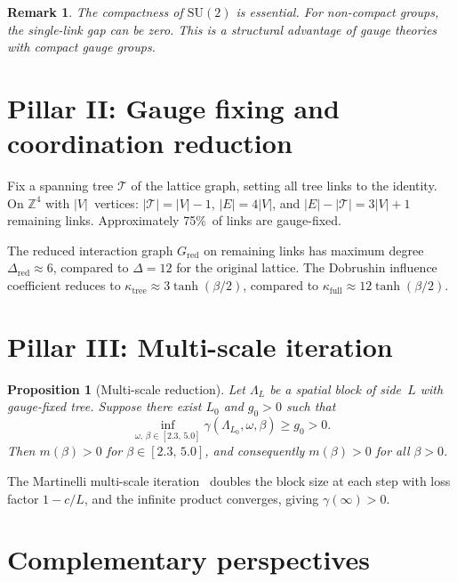 \documentclass[12pt,a4paper]{article}
\newtheorem{proposition}[theorem]{Proposition}
\newtheorem{remark}[theorem]{Remark}
\newcommand{\Z}{\mathbb{Z}}
\begin{document}
\begin{remark}
The compactness of $\mathrm{SU}(2)$ is essential. For non-compact groups, the single-link gap can be zero. This is a structural advantage of gauge theories with compact gauge groups.
\end{remark}

\section{Pillar II: Gauge fixing and coordination reduction}\label{sec:gauge}

Fix a spanning tree $\mathcal{T}$ of the lattice graph, setting all tree links to the identity. On $\Z^4$ with $|V|$~vertices: $|\mathcal{T}|=|V|-1$, $|E|=4|V|$, and $|E|-|\mathcal{T}|=3|V|{+}1$ remaining links. Approximately 75\%~of links are gauge-fixed.

The reduced interaction graph $G_{\mathrm{red}}$ on remaining links has maximum degree $\Delta_{\mathrm{red}}\approx 6$, compared to $\Delta=12$ for the original lattice. The Dobrushin influence coefficient reduces to $\kappa_{\mathrm{tree}}\approx 3\tanh(\beta/2)$, compared to $\kappa_{\mathrm{full}}\approx 12\tanh(\beta/2)$.

\section{Pillar III: Multi-scale iteration}\label{sec:multi}

\begin{proposition}[Multi-scale reduction]\label{prop:multi}
Let $\Lambda_L$ be a spatial block of side~$L$ with gauge-fixed tree. Suppose there exist $L_0$ and $g_0>0$ such that
\begin{equation}\label{eq:block_condition}
\inf_{\omega,\,\beta\in[2.3,\,5.0]} \gamma(\Lambda_{L_0},\omega,\beta) \ge g_0 > 0.
\end{equation}
Then $m(\beta)>0$ for $\beta\in[2.3,\,5.0]$, and consequently $m(\beta)>0$ for all $\beta>0$.
\end{proposition}

The Martinelli multi-scale iteration~\cite{Martinelli1999} doubles the block size at each step with loss factor $1-c/L$, and the infinite product converges, giving $\gamma(\infty)>0$.

\section{Complementary perspectives}\label{sec:perspectives}
\end{document}
